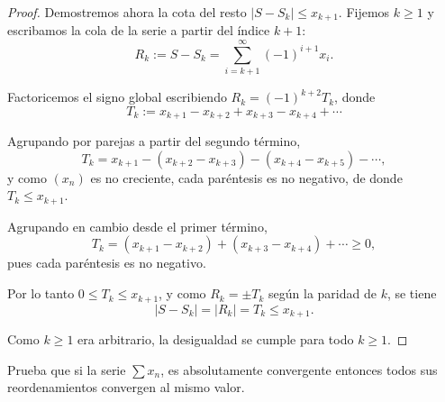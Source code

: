 \documentclass[12pt,a4paper]{article}
\begin{document}
\begin{proof}
        Demostremos ahora la cota del resto $|S-S_k|\le x_{k+1}$. Fijemos $k\ge1$ y escribamos la
        cola de la serie a partir del índice $k+1$:
        \begin{equation*}
            R_k:=S-S_k=\sum_{i=k+1}^{\infty}(-1)^{i+1}x_i.
        \end{equation*}

        Factoricemos el signo global escribiendo $R_k=(-1)^{k+2}T_k$, donde
        \begin{equation*}
            T_k := x_{k+1}-x_{k+2}+x_{k+3}-x_{k+4}+\cdots
        \end{equation*}

        Agrupando por parejas a partir del segundo término,
        \begin{equation*}
            T_k = x_{k+1}-(x_{k+2}-x_{k+3})-(x_{k+4}-x_{k+5})-\cdots,
        \end{equation*}
        y como $(x_n)$ es no creciente, cada paréntesis es no negativo, de donde $T_k\le x_{k+1}$.

        Agrupando en cambio desde el primer término,
        \begin{equation*}
            T_k = (x_{k+1}-x_{k+2})+(x_{k+3}-x_{k+4})+\cdots \ge 0,
        \end{equation*}
        pues cada paréntesis es no negativo.

        Por lo tanto $0\le T_k\le x_{k+1}$, y como $R_k=\pm T_k$ según la paridad de $k$, se tiene
        \begin{equation*}
            |S-S_k|=|R_k|=T_k\le x_{k+1}.
        \end{equation*}

        Como $k\ge1$ era arbitrario, la desigualdad se cumple para todo $k\ge1$.
    \end{proof}

    \begin{ejercicio}
        Prueba que si la serie $\sum x_{n}$, es absolutamente
        convergente entonces todos sus reordenamientos convergen al mismo valor.
    \end{ejercicio}
\end{document}
